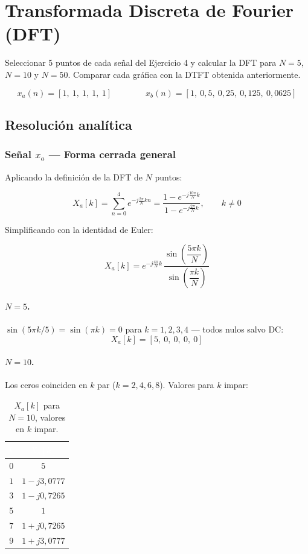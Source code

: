 \documentclass[../Main_Include.tex]{subfiles}
\begin{document}
\newpage
\section{Transformada Discreta de Fourier (DFT)}

Seleccionar 5 puntos de cada señal del Ejercicio 4 y calcular la DFT
para $N = 5$, $N = 10$ y $N = 50$. Comparar cada gráfica con la DTFT
obtenida anteriormente.

\[
    x_a(n) = [1,\ 1,\ 1,\ 1,\ 1]
    \qquad\qquad
    x_b(n) = [1,\ 0{,}5,\ 0{,}25,\ 0{,}125,\ 0{,}0625]
\]

\subsection*{Resolución analítica}

\subsubsection*{Señal $x_a$ — Forma cerrada general}

Aplicando la definición de la DFT de $N$ puntos:

\[
    X_a[k] = \sum_{n=0}^{4} e^{-j\frac{2\pi}{N}kn}
    = \frac{1 - e^{-j\frac{10\pi}{N}k}}{1 - e^{-j\frac{2\pi}{N}k}},
    \qquad k \neq 0
\]

Simplificando con la identidad de Euler:

\[
    \boxed{X_a[k] = e^{-j\frac{4\pi}{N}k}\,
    \frac{\sin\!\left(\dfrac{5\pi k}{N}\right)}
         {\sin\!\left(\dfrac{\pi k}{N}\right)}}
\]

\paragraph{$N = 5$.}
$\sin(5\pi k/5) = \sin(\pi k) = 0$ para $k = 1,2,3,4$
— todos nulos salvo DC:
\[
    X_a[k] = [5,\ 0,\ 0,\ 0,\ 0]
\]

\paragraph{$N = 10$.}
Los ceros coinciden en $k$ par ($k = 2,4,6,8$). Valores para $k$ impar:

\begin{table}[H]
\centering
\renewcommand{\arraystretch}{1.4}
\begin{tabular}{cc}
\toprule
\rowcolor{azulprinc}
\textcolor{white}{\textbf{$k$}} &
\textcolor{white}{\textbf{$X_a[k]$}} \\
\midrule
\rowcolor{grisclaro}
$0$ & $5$ \\
$1$ & $1 - j3{,}0777$ \\
\rowcolor{grisclaro}
$3$ & $1 - j0{,}7265$ \\
$5$ & $1$ \\
\rowcolor{grisclaro}
$7$ & $1 + j0{,}7265$ \\
$9$ & $1 + j3{,}0777$ \\
\bottomrule
\end{tabular}
\caption{$X_a[k]$ para $N = 10$, valores en $k$ impar.}
\end{table}
\end{document}
